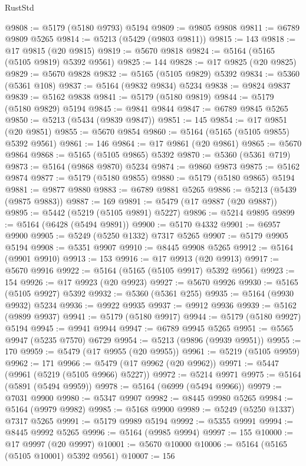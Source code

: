 \begin{lexlean}{RustStd}
\begin{coremodule}
@9808 := @5179 (@5180 @9793) @5194
@9809 := @9805 @9808
@9811 := @6789 @9809 @5265
@9814 := @5213 (@5429 (@9803 @9811))
@9815 := 143
@9818 := @17 @9815 (@20 @9815)
@9819 := @5670 @9818
@9824 := @5164 (@5165 (@5105 @9819) @5392 @9561)
@9825 := 144
@9828 := @17 @9825 (@20 @9825)
@9829 := @5670 @9828
@9832 := @5165 (@5105 @9829) @5392
@9834 := @5360 (@5361 @108)
@9837 := @5164 (@9832 @9834) @5234
@9838 := @9824 @9837
@9839 := @5162 @9838
@9841 := @5179 (@5180 @9819)
@9844 := @5179 (@5180 @9829) @5194
@9845 := @9841 @9844
@9847 := @6789 @9845 @5265
@9850 := @5213 (@5434 (@9839 @9847))
@9851 := 145
@9854 := @17 @9851 (@20 @9851)
@9855 := @5670 @9854
@9860 := @5164 (@5165 (@5105 @9855) @5392 @9561)
@9861 := 146
@9864 := @17 @9861 (@20 @9861)
@9865 := @5670 @9864
@9868 := @5165 (@5105 @9865) @5392
@9870 := @5360 (@5361 @719)
@9873 := @5164 (@9868 @9870) @5234
@9874 := @9860 @9873
@9875 := @5162 @9874
@9877 := @5179 (@5180 @9855)
@9880 := @5179 (@5180 @9865) @5194
@9881 := @9877 @9880
@9883 := @6789 @9881 @5265
@9886 := @5213 (@5439 (@9875 @9883))
@9887 := 169
@9891 := @5479 (@17 @9887 (@20 @9887))
@9895 := @5442 (@5219 (@5105 @9891) @5227)
@9896 := @5214 @9895
@9899 := @5164 (@6428 (@5494 @9891))
@9900 := @5170 @4332
@9901 := @6957 @9900
@9905 := @5249 (@5250 @1332) @7317 @5265
@9907 := @5179 @9905 @5194
@9908 := @5351 @9907
@9910 := @8445 @9908 @5265
@9912 := @5164 (@9901 @9910)
@9913 := 153
@9916 := @17 @9913 (@20 @9913)
@9917 := @5670 @9916
@9922 := @5164 (@5165 (@5105 @9917) @5392 @9561)
@9923 := 154
@9926 := @17 @9923 (@20 @9923)
@9927 := @5670 @9926
@9930 := @5165 (@5105 @9927) @5392
@9932 := @5360 (@5361 @255)
@9935 := @5164 (@9930 @9932) @5234
@9936 := @9922 @9935
@9937 := @9912 @9936
@9939 := @5162 (@9899 @9937)
@9941 := @5179 (@5180 @9917)
@9944 := @5179 (@5180 @9927) @5194
@9945 := @9941 @9944
@9947 := @6789 @9945 @5265
@9951 := @5565 @9947 (@5235 @7570) @6729
@9954 := @5213 (@9896 (@9939 @9951))
@9955 := 170
@9959 := @5479 (@17 @9955 (@20 @9955))
@9961 := @5219 (@5105 @9959)
@9962 := 171
@9966 := @5479 (@17 @9962 (@20 @9962))
@9971 := @5447 (@9961 (@5219 (@5105 @9966) @5227))
@9972 := @5214 @9971
@9975 := @5164 (@5891 (@5494 @9959))
@9978 := @5164 (@6999 (@5494 @9966))
@9979 := @7031 @9900
@9980 := @5347 @9907
@9982 := @8445 @9980 @5265
@9984 := @5164 (@9979 @9982)
@9985 := @5168 @9900
@9989 := @5249 (@5250 @1337) @7317 @5265
@9991 := @5179 @9989 @5194
@9992 := @5355 @9991
@9994 := @8445 @9992 @5265
@9996 := @5164 (@9985 @9994)
@9997 := 155
@10000 := @17 @9997 (@20 @9997)
@10001 := @5670 @10000
@10006 := @5164 (@5165 (@5105 @10001) @5392 @9561)
@10007 := 156

\end{coremodule}
\end{lexlean}

